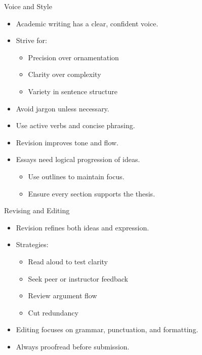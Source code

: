 \documentclass[aspectratio=169]{beamer}
\begin{document}

\begin{frame}{Voice and Style}
\begin{itemize}
  \item Academic writing has a clear, confident voice.
  \item Strive for:
    \begin{itemize}
      \item Precision over ornamentation
      \item Clarity over complexity
      \item Variety in sentence structure
    \end{itemize}
  \item Avoid jargon unless necessary.
  \item Use active verbs and concise phrasing.
  \item Revision improves tone and flow.
  \item Essays need logical progression of ideas.
    \begin{itemize}
 \item Use outlines to maintain focus.
  \item Ensure every section supports the thesis.
    \end{itemize}
\end{itemize}
\end{frame}

\begin{frame}{Revising and Editing}
\begin{itemize}
  \item Revision refines both ideas and expression.
  \item Strategies:
    \begin{itemize}
      \item Read aloud to test clarity
      \item Seek peer or instructor feedback
      \item Review argument flow
      \item Cut redundancy
    \end{itemize}
  \item Editing focuses on grammar, punctuation, and formatting.
  \item Always proofread before submission.
\end{itemize}
\end{frame}
\end{document}
